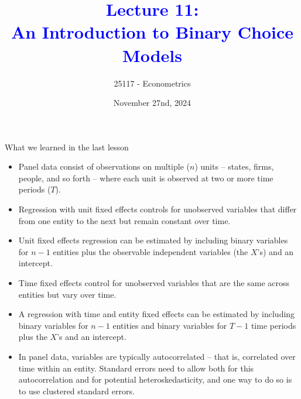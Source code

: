 \documentclass[notes,10pt, aspectratio=169]{beamer}
\title[]{\textcolor{blue}{Lecture 11:\\An Introduction to Binary Choice Models}}
\author{25117 - Econometrics}
\institute[shortinst]{Universitat Pompeu Fabra}
\date{November 27nd, 2024}
\begin{document}
\begin{frame}[plain]
\maketitle
\end{frame}



\begin{frame}{What we learned in the last lesson}
\begin{itemize}
\item Panel data consist of observations on multiple ($n$) units -- states, firms, people, and so forth -- where each unit is observed at two or more time periods ($T$).
\item Regression with unit fixed effects controls for unobserved variables that differ from one entity to the next but remain constant over time.
\item Unit fixed effects regression can be estimated by including binary variables for $n - 1$ entities plus the observable independent variables (the $X$’s) and an intercept.
\item Time fixed effects control for unobserved variables that are the same across entities but vary over time.
\item A regression with time and entity fixed effects can be estimated by including binary variables for $n - 1$ entities and binary variables for $T - 1$ time periods plus the $X$’s and an intercept.
\item In panel data, variables are typically autocorrelated -- that is, correlated over time within an entity. Standard errors need to allow both for this autocorrelation and for potential heteroskedasticity, and one way to do so is to use clustered standard errors.
\end{itemize}
\end{frame}
\end{document}
